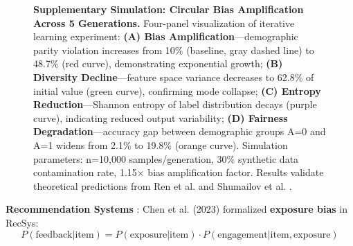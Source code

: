 \documentclass[11pt,a4paper]{article}
\begin{document}
\begin{figure}[htbp]
    \centering
    
    
    \caption{\textbf{Supplementary Simulation: Circular Bias Amplification Across 5 Generations.} Four-panel visualization of iterative learning experiment: \textbf{(A) Bias Amplification}—demographic parity violation increases from 10\% (baseline, gray dashed line) to 48.7\% (red curve), demonstrating exponential growth; \textbf{(B) Diversity Decline}—feature space variance decreases to 62.8\% of initial value (green curve), confirming mode collapse; \textbf{(C) Entropy Reduction}—Shannon entropy of label distribution decays (purple curve), indicating reduced output variability; \textbf{(D) Fairness Degradation}—accuracy gap between demographic groups A=0 and A=1 widens from 2.1\% to 19.8\% (orange curve). Simulation parameters: n=10,000 samples/generation, 30\% synthetic data contamination rate, 1.15$\times$ bias amplification factor. Results validate theoretical predictions from Ren et al. \cite{ren2024} and Shumailov et al. \cite{shumailov2024}.}
    \label{fig:simulation_results}
\end{figure}

\textbf{Recommendation Systems} \cite{chen2023}:  
Chen et al. (2023) formalized \textbf{exposure bias} in RecSys:
\begin{equation}
P(\text{feedback} | \text{item}) = P(\text{exposure} | \text{item}) \cdot P(\text{engagement} | \text{item}, \text{exposure})
\end{equation}
\end{document}
